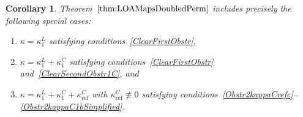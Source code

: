 \documentclass[pdftex]{sigma}
\numberwithin{equation}{section}
\newtheorem{Corollary}[Theorem]{Corollary}
\DeclareMathOperator{\refl}{ref}
\begin{document}
\begin{Corollary}\label{SpecialCases}
Theorem~$\ref{thm:LOAMapsDoubledPerm}$ includes precisely the following special cases:
\begin{enumerate}[label=$(\arabic*)$]\itemsep=0pt
\item $\kappa=\kappa^L_1$ satisfying conditions~\eqref{ClearFirstObstr},
\item $\kappa=\kappa^L_1+\kappa^C_1$ satisfying conditions~\eqref{ClearFirstObstr} and~\eqref{ClearSecondObstr1C}, and
\item $\kappa=\kappa^L_1+\kappa^C_1+\kappa^C_{\refl}$ with $\kappa^C_{\refl}\not\equiv 0$
satisfying conditions~\eqref{Obstr2kappaCrefc}--\eqref{Obstr2kappaC1bSimplified}.
\end{enumerate}
\end{Corollary}
\end{document}
